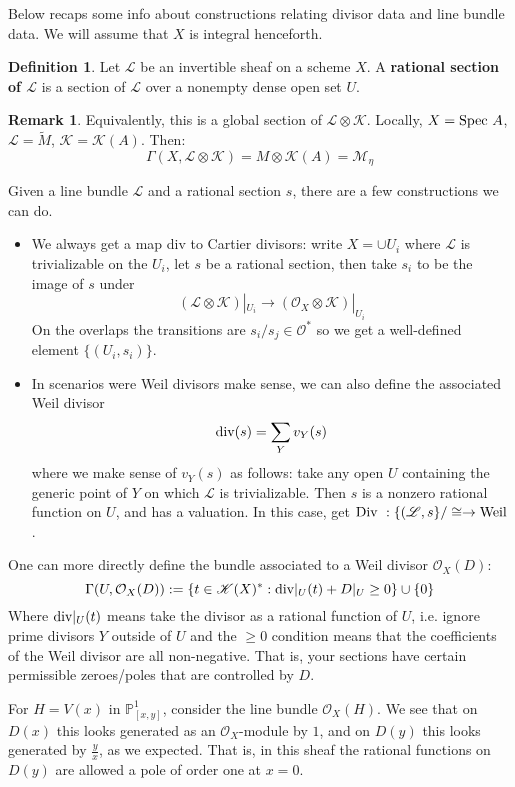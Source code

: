 \documentclass[10pt,reqno]{amsart}
\theoremstyle{definition}
\newtheorem{definition}[theorem]{Definition}
\newtheorem{remark}[theorem]{Remark}
\theoremstyle{remark}
\numberwithin{equation}{section}
\numberwithin{theorem}{section}
\newcommand*{\red}{\textcolor{red}}
\newcommand{\OO}{{\mathcal O}}
\newcommand{\spec}{\textup{Spec }}
\newcommand{\Div}{\textup{Div }}
\newcommand{\ddiv}{\textup{div}}
\newcommand{\LL}{{\mathscr L}}
\newcommand{\K}{{\mathscr K}}
\newcommand{\KK}{{\mathscr K}}
\newcommand{\MM}{{\mathscr M}}
\newcommand{\wt}{\widetilde}
\newcommand{\PP}{{\mathbb P}}
\begin{document}
Below recaps some info about constructions relating divisor data and line bundle data. We will assume that $X$ is integral henceforth.

\begin{definition}
Let $\LL$ be an invertible sheaf on a scheme $X$. A \textbf{rational section of $\LL$} is a section of $\LL$ over a nonempty dense open set $U$.
\end{definition}

\begin{remark} Equivalently, this is a global section of $\LL \otimes \KK$. Locally, $X = \spec A$, $\LL = \wt{M}$, $\KK = \KK(A)$. Then:
\[\Gamma(X,\LL \otimes \KK) = M \otimes \KK(A) = \MM_{\eta}\]
\end{remark}

Given a line bundle $\LL$ and a rational section $s$, there are a few constructions we can do.
\begin{itemize}
\item We always get a map div to Cartier divisors: write $X = \cup U_i$ where $\LL$ is trivializable on the $U_i$, let $s$ be a rational section, then take $s_i$ to be the image of $s$ under
\[(\LL \otimes \KK)|_{U_i} \to (\OO_X \otimes \KK)|_{U_i} \]
On the overlaps the transitions are $s_i/s_j \in \OO^*$ so we get a well-defined element $\{(U_i,s_i)\}$.
\item In scenarios were Weil divisors make sense, we can also define the associated Weil divisor 
\[\ddiv(s) = \sum_Y v_Y(s)\]
where we make sense of $v_Y(s)$ as follows: take any open $U$ containing the generic point of $Y$ on which $\LL$ is trivializable. Then $s$ is a nonzero rational function on $U$, and has a valuation. In this case, get $\Div: \{(\LL,s\}/\cong \to \textup{Weil}$. %
\end{itemize}

One can more directly define the bundle associated to a Weil divisor $\OO_X(D)$:
\[\Gamma(U, \OO_X(D)) := \{t \in \K(X)^*: \ddiv|_U(t) + D|_U \ge 0\} \cup \{0\}\]
Where $\ddiv|_U (t)$ means take the divisor as a rational function of $U$, i.e. ignore prime divisors $Y$ outside of $U$ and the $\ge 0$ condition means that the coefficients of the Weil divisor are all non-negative. That is, your sections have certain permissible zeroes/poles that are controlled by $D$.

For $H = V(x)$ in $\PP^1_{[x,y]}$, consider the line bundle $\OO_X(H)$. We see that on $D(x)$ this looks generated as an $\OO_X$-module by $1$, and on $D(y)$ this looks generated by $\frac{y}{x}$, as we expected. That is, in this sheaf the rational functions on $D(y)$ are allowed a pole of order one at $x=0$.
\end{document}
